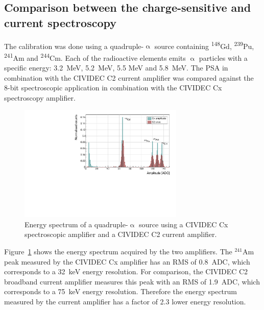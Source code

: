 \subsection{Comparison between the charge-sensitive and current spectroscopy}
The calibration was done using a quadruple-$\upalpha$ source containing \textsuperscript{148}Gd, \textsuperscript{239}Pu, \textsuperscript{241}Am and \textsuperscript{244}Cm. Each of the radioactive elements emits $\upalpha$ particles with a specific energy: 3.2~MeV, 5.2~MeV, 5.5 MeV and 5.8~MeV. The PSA in combination with the CIVIDEC C2 current amplifier was compared against the 8-bit spectroscopic application in combination with the CIVIDEC Cx spectroscopy amplifier.%

\begin{figure}[!t]
\centering
\includegraphics[width=0.7\textwidth]{../scripts/05_current_monitoring/plot4alpha/plots/4alphaCompare}
\caption{Energy spectrum of a quadruple-$\upalpha$ source using a CIVIDEC Cx spectroscopic amplifier and a CIVIDEC C2 current amplifier.}
\label{fig:c2cx4alpha}
\end{figure}

Figure~\ref{fig:c2cx4alpha} shows the energy spectrum acquired by the two amplifiers. The $^{241}$Am peak measured by the CIVIDEC Cx amplifier has an RMS of 0.8~ADC, which corresponds to a 32~keV energy resolution. For comparison, the CIVIDEC C2 broadband current amplifier measures this peak with an RMS of 1.9~ADC, which corresponds to a 75~keV energy resolution. Therefore the energy spectrum measured by the current amplifier has a factor of 2.3 lower energy resolution.









